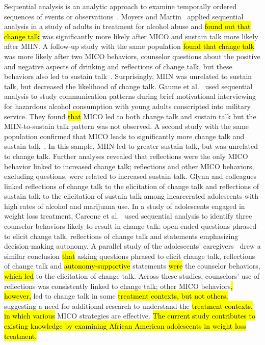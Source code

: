 \documentclass[smallextended]{svjour3}       %
\begin{document}
Sequential analysis is an analytic approach to examine temporally ordered sequences of events or observations~\cite{bakeman1997observing, bakeman2011sequential}. Moyers and Martin~\cite{moyers2006therapist} applied sequential analysis in a study of adults in treatment for alcohol abuse and \hl{found out that change talk} was significantly more likely after MICO and sustain talk more likely after MIIN. A follow-up study with the same population \hl{found that change talk} was more likely after two MICO behaviors, counselor questions about the positive and negative aspects of drinking and reflections of change talk, but these behaviors also led to sustain talk~\cite{moyers2009session}. Surprisingly, MIIN was unrelated to sustain talk, but decreased the likelihood of change talk. Gaume et al.~\cite{gaume2008counsellor} used sequential analysis to study communication patterns during brief motivational interviewing for hazardous alcohol consumption with young adults conscripted into military service. They found \hl{that} MICO led to both change talk and sustain talk but the MIIN-to-sustain talk pattern was not observed. A second study with the same population confirmed that MICO leads to significantly more change talk and sustain talk~\cite{gaume2010counselor}. In this sample, MIIN led to greater sustain talk, but was unrelated to change talk. Further analyses revealed that reflections were the only MICO behavior linked to increased change talk; reflections and other MICO behaviors, excluding questions, were related to increased sustain talk. Glynn and colleagues~\cite{glynn2014change} linked reflections of change talk to the elicitation of change talk and reflections of sustain talk to the elicitation of sustain talk among incarcerated adolescents with high rates of alcohol and marijuana use. In a study of adolescents engaged in weight loss treatment, Carcone et al.~\cite{carcone2013provider} used sequential analysis to identify three counselor behaviors likely to result in change talk: open-ended questions phrased to elicit change talk, reflections of change talk and statements emphasizing decision-making autonomy. A parallel study of the adolescents' caregivers~\cite{jacques2016building} drew a similar conclusion \hl{that} asking questions phrased to elicit change talk, reflections of change talk and \hl{autonomy-supportive} statements \hl{were} the counselor behaviors, \hl{which led} to the elicitation of change talk. Across these studies, counselors' use of reflections was consistently linked to change talk; other MICO behaviors\hl{, however, }led to change talk in some \hl{treatment contexts, but not others,} suggesting a need for additional research to understand the \hl{treatment contexts, in which various} MICO strategies are effective. \hl{The current study contributes to existing knowledge by examining African American adolescents in weight loss treatment.} 
\end{document}
